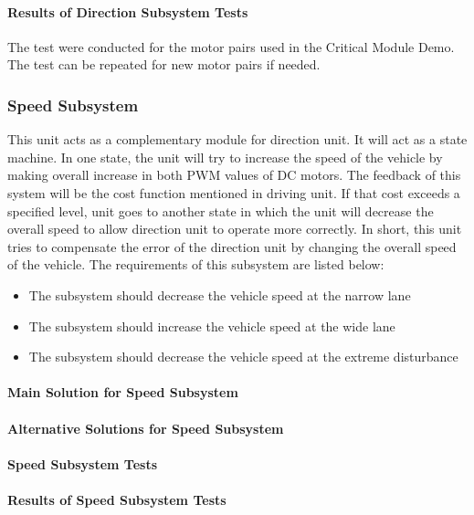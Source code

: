 \documentclass[a4paper,12pt]{article}
\begin{document}
	\paragraph{Results of Direction Subsystem Tests}
		
		The test were conducted for the motor pairs used in the Critical Module Demo. The test can be repeated for new motor pairs if needed.
	
	
	\subsubsection{Speed Subsystem}
	
	This unit acts as a complementary module for direction unit. It will act as a state machine. In one state, the unit will try to increase the speed of the vehicle by making overall increase in both PWM values of DC motors. The feedback of this  system will be the cost function mentioned in driving unit. If that cost exceeds a specified level, unit goes to another state in which the unit will decrease the overall speed to allow direction unit to operate more correctly. In short, this unit tries to compensate the error of the direction unit by changing the overall speed of the vehicle. The requirements of this subsystem are listed below:
	\begin{itemize}
		\item The subsystem should decrease the vehicle speed at the narrow lane 
		\item The subsystem should increase the vehicle speed at the wide lane 
		\item The subsystem should decrease the vehicle speed at the extreme disturbance  
	\end{itemize}
	
	\paragraph{Main Solution for Speed Subsystem}
	
	\paragraph{Alternative Solutions for Speed Subsystem}
	
	\paragraph{Speed Subsystem Tests}
	
	\paragraph{Results of Speed Subsystem Tests}
	
\end{document}
